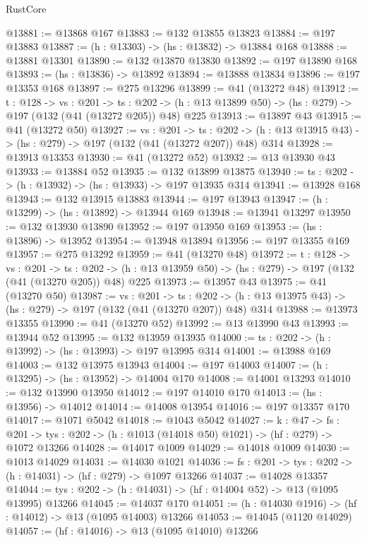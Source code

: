 \begin{lexlean}{RustCore}
\begin{coremodule}
@13881 := @13868 @167
@13883 := @132 @13855 @13823
@13884 := @197 @13883
@13887 := (h : @13303) -> (hs : @13832) -> @13884 @168
@13888 := @13881 @13301
@13890 := @132 @13870 @13830
@13892 := @197 @13890 @168
@13893 := (hs : @13836) -> @13892
@13894 := @13888 @13834
@13896 := @197 @13353 @168
@13897 := @275 @13296
@13899 := @41 (@13272 @48)
@13912 := {t : @128} ->
  {vs : @201} ->
  {ts : @202} -> (h : @13 @13899 @50) -> (hs : @279) -> @197 (@132 (@41 (@13272 @205)) @48) @225
@13913 := @13897 @43
@13915 := @41 (@13272 @50)
@13927 := {vs : @201} ->
  {ts : @202} -> (h : @13 @13915 @43) -> (hs : @279) -> @197 (@132 (@41 (@13272 @207)) @48) @314
@13928 := @13913 @13353
@13930 := @41 (@13272 @52)
@13932 := @13 @13930 @43
@13933 := @13884 @52
@13935 := @132 @13899 @13875
@13940 := {ts : @202} -> (h : @13932) -> (hs : @13933) -> @197 @13935 @314
@13941 := @13928 @168
@13943 := @132 @13915 @13883
@13944 := @197 @13943
@13947 := (h : @13299) -> (hs : @13892) -> @13944 @169
@13948 := @13941 @13297
@13950 := @132 @13930 @13890
@13952 := @197 @13950 @169
@13953 := (hs : @13896) -> @13952
@13954 := @13948 @13894
@13956 := @197 @13355 @169
@13957 := @275 @13292
@13959 := @41 (@13270 @48)
@13972 := {t : @128} ->
  {vs : @201} ->
  {ts : @202} -> (h : @13 @13959 @50) -> (hs : @279) -> @197 (@132 (@41 (@13270 @205)) @48) @225
@13973 := @13957 @43
@13975 := @41 (@13270 @50)
@13987 := {vs : @201} ->
  {ts : @202} -> (h : @13 @13975 @43) -> (hs : @279) -> @197 (@132 (@41 (@13270 @207)) @48) @314
@13988 := @13973 @13355
@13990 := @41 (@13270 @52)
@13992 := @13 @13990 @43
@13993 := @13944 @52
@13995 := @132 @13959 @13935
@14000 := {ts : @202} -> (h : @13992) -> (hs : @13993) -> @197 @13995 @314
@14001 := @13988 @169
@14003 := @132 @13975 @13943
@14004 := @197 @14003
@14007 := (h : @13295) -> (hs : @13952) -> @14004 @170
@14008 := @14001 @13293
@14010 := @132 @13990 @13950
@14012 := @197 @14010 @170
@14013 := (hs : @13956) -> @14012
@14014 := @14008 @13954
@14016 := @197 @13357 @170
@14017 := @1071 @5042
@14018 := @1043 @5042
@14027 := {k : @47} ->
  {fs : @201} -> {tys : @202} -> (h : @1013 (@14018 @50) @1021) -> (hf : @279) -> @1072 @13266
@14028 := @14017 @1009
@14029 := @14018 @1009
@14030 := @1013 @14029
@14031 := @14030 @1021
@14036 := {fs : @201} -> {tys : @202} -> (h : @14031) -> (hf : @279) -> @1097 @13266
@14037 := @14028 @13357
@14044 := {tys : @202} -> (h : @14031) -> (hf : @14004 @52) -> @13 (@1095 @13995) @13266
@14045 := @14037 @170
@14051 := (h : @14030 @1916) -> (hf : @14012) -> @13 (@1095 @14003) @13266
@14053 := @14045 (@1120 @14029)
@14057 := (hf : @14016) -> @13 (@1095 @14010) @13266

\end{coremodule}
\end{lexlean}
